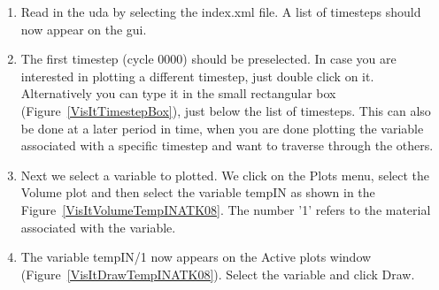 \begin{enumerate}

\item Read in the uda by selecting the index.xml file. A list of
  timesteps should now appear on the gui.



\item The first timestep (cycle 0000) should be preselected. In case you
are interested in plotting a different timestep, just double click on
it. Alternatively you can type it in the small rectangular box
(Figure~\ref{VisItTimestepBox}), just below the list of
timesteps. This can also be done at a later period in time, when you
are done plotting the variable associated with a specific timestep and
want to traverse through the others.


\item Next we select a variable to plotted. We click on the Plots
  menu, select the Volume plot and then select the variable tempIN as
  shown in the Figure~\ref{VisItVolumeTempINATK08}. The number '1'
  refers to the material associated with the variable.


\item The variable tempIN/1 now appears on the Active plots window
  (Figure~\ref{VisItDrawTempINATK08}). Select the variable and click
  Draw.

\begin{figure}[h]
  \centering
  \vspace{-10pt}
  \hspace{10pt}
  \hspace{10pt}
  \caption{}
  \vspace{-10pt}
  \label{}
\end{figure}





\end{enumerate}
